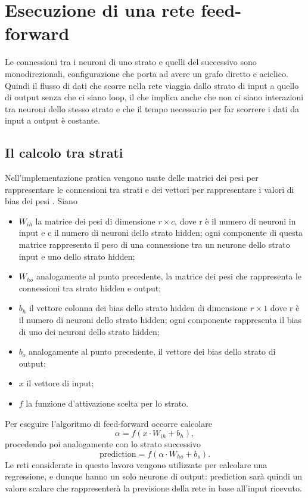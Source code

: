 \documentclass[12pt]{report}
\begin{document}
\section{Esecuzione di una rete feed-forward}
Le connessioni tra i neuroni di uno strato e quelli del successivo sono monodirezionali, configurazione che porta ad avere un grafo diretto e aciclico. Quindi il flusso di dati che scorre nella rete viaggia dallo strato di input a quello di output senza che ci siano loop, il che implica anche che non ci siano interazioni tra neuroni dello stesso strato e che il tempo necessario per far scorrere i dati da input a output è costante.

\subsection{Il calcolo tra strati}\label{feedforward}
Nell'implementazione pratica vengono usate delle matrici dei pesi per rappresentare le connessioni tra strati e dei vettori per rappresentare i valori di bias dei pesi . 
Siano 
\begin{itemize}
\item{$W_{ih}$} la matrice dei pesi di dimensione $r \times c$, dove r è il numero di neuroni in input e c il numero di neuroni dello strato hidden; ogni componente di questa matrice rappresenta il peso di una connessione tra un neurone dello strato input e uno dello strato hidden;
\item{$W_{ho}$} analogamente al punto precedente, la matrice dei pesi che rappresenta le connessioni tra strato hidden e output;
\item{$b_h$} il vettore colonna dei bias dello strato hidden di dimensione $r \times 1$ dove r è il numero di neuroni dello strato hidden; ogni componente rappresenta il bias di uno dei neuroni dello strato hidden;
\item{$b_o$} analogamente al punto precedente, il vettore dei bias dello strato di output;
\item{$x$} il vettore di input;
\item{$f$} la funzione d'attivazione scelta per lo strato.
\end{itemize}
Per eseguire l'algoritmo di feed-forward occorre calcolare
$$\alpha = f\left(x \cdot W_{ih} + b_h\right),$$
procedendo poi analogamente con lo strato successivo
$$\mathrm{prediction} = f\left(\alpha \cdot W_{ho} + b_o\right).$$
Le reti considerate in questo lavoro vengono utilizzate per calcolare una regressione, e dunque hanno un solo neurone di output: prediction sarà quindi un valore scalare che rappresenterà la previsione della rete in base all'input ricevuto.
\end{document}
